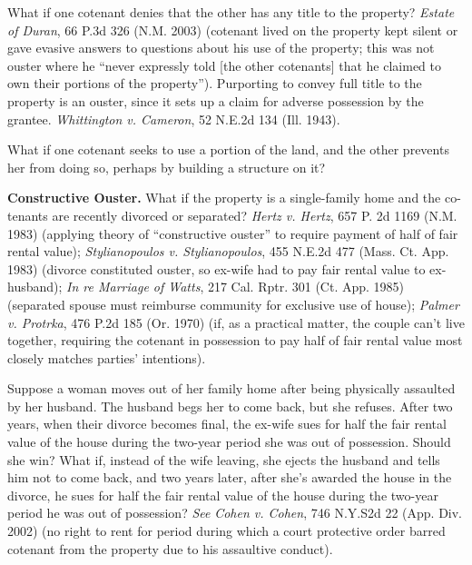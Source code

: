 What if one cotenant denies that the other has any title to the property?
\emph{Estate of Duran}, 66 P.3d 326 (N.M. 2003) (cotenant lived on the property
kept silent or gave evasive answers to questions about his use of the property;
this was not ouster where he ``never expressly told [the other cotenants] that
he claimed to own their portions of the property''). Purporting to convey full
title to the property is an ouster, since it sets up a claim for adverse
possession by the grantee. \emph{Whittington v. Cameron}, 52 N.E.2d 134 (Ill.
1943).




What if one cotenant seeks to use a portion of the land, and the other prevents
her from doing so, perhaps by building a structure on it?



\item \textbf{Constructive Ouster.} What if the property is a single-family home
and the co-tenants are recently divorced or separated? \emph{Hertz v. Hertz},
657 P. 2d 1169 (N.M. 1983) (applying theory of ``constructive ouster'' to
require payment of half of fair rental value); \emph{Stylianopoulos v.
Stylianopoulos}, 455 N.E.2d 477 (Mass. Ct. App. 1983) (divorce constituted
ouster, so ex-wife had to pay fair rental value to ex-husband); \emph{In re
Marriage of Watts}, 217 Cal. Rptr. 301 (Ct. App. 1985) (separated spouse must
reimburse community for exclusive use of house); \emph{Palmer v. Protrka}, 476
P.2d 185 (Or. 1970) (if, as a practical matter, the couple can't live together,
requiring the cotenant in possession to pay half of fair rental value most
closely matches parties' intentions).


Suppose a woman moves out of her family home after being physically assaulted by
her husband. The husband begs her to come back, but she refuses. After two
years, when their divorce becomes final, the ex-wife sues for half the fair
rental value of the house during the two-year period she was out of possession.
 Should she win? What if, instead of the wife leaving, she ejects the husband
and tells him not to come back, and two years later, after she's awarded the
house in the divorce, he sues for half the fair rental value of the house
during the two-year period he was out of possession? \emph{See} \emph{Cohen v.
Cohen}, 746 N.Y.S2d 22 (App. Div. 2002) (no right to rent for period during
which a court protective order barred cotenant from the property due to his
assaultive conduct).




